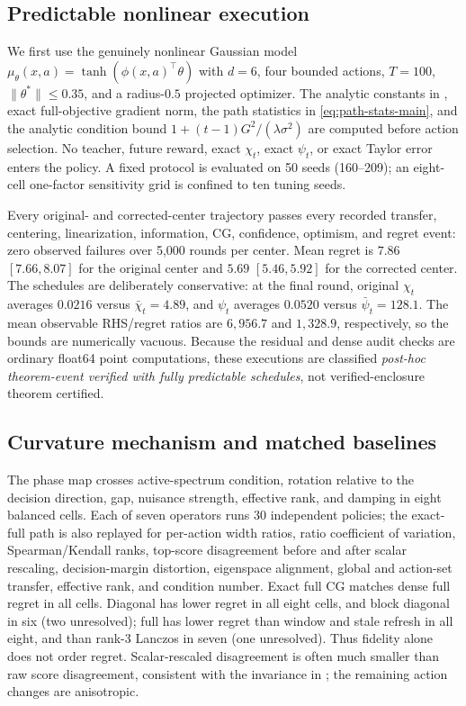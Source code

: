 \documentclass[twoside]{article}
\begin{document}
\subsection{Predictable nonlinear execution}\label{sec:factorial-audit}
We first use the genuinely nonlinear Gaussian model
$\mu_\theta(x,a)=\tanh(\phi(x,a)^\top\theta)$ with $d=6$, four bounded actions,
$T=100$, $\|\theta^*\|\le0.35$, and a radius-$0.5$ projected optimizer.  The
analytic constants in , exact full-objective gradient norm,
the path statistics in \eqref{eq:path-stats-main}, and the analytic condition bound
$1+(t-1)G^2/(\lambda\sigma^2)$ are computed before action selection.  No teacher,
future reward, exact $\chi_t$, exact $\psi_t$, or exact Taylor error enters the
policy.  A fixed protocol is evaluated on 50 seeds (160--209); an eight-cell
one-factor sensitivity grid is confined to ten tuning seeds.

Every original- and corrected-center trajectory passes every recorded transfer,
centering, linearization, information, CG, confidence, optimism, and regret event:
zero observed failures over 5,000 rounds per center.  Mean regret is $7.86$
$[7.66,8.07]$ for the original center and $5.69$ $[5.46,5.92]$ for the corrected
center.  The schedules are deliberately conservative: at the final round, original
$\chi_t$ averages $0.0216$ versus $\bar\chi_t=4.89$, and $\psi_t$ averages
$0.0520$ versus $\bar\psi_t=128.1$.  The mean observable RHS/regret ratios are
$6{,}956.7$ and $1{,}328.9$, respectively, so the bounds are numerically vacuous.
Because the residual and dense audit checks are ordinary float64 point computations,
these executions are classified \emph{post-hoc theorem-event verified with fully
predictable schedules}, not verified-enclosure theorem certified.

\subsection{Curvature mechanism and matched baselines}\label{sec:operator-cg-audit}
The phase map crosses active-spectrum condition, rotation relative to the decision
direction, gap, nuisance strength, effective rank, and damping in eight balanced
cells.  Each of seven operators runs 30 independent policies; the exact-full path
is also replayed for per-action width ratios, ratio coefficient of variation,
Spearman/Kendall ranks, top-score disagreement before and after scalar rescaling,
decision-margin distortion, eigenspace alignment, global and action-set transfer,
effective rank, and condition number.  Exact full CG matches dense full regret in
all cells.  Diagonal has lower regret in all eight cells, and block diagonal in six
(two unresolved); full has lower regret than window and stale refresh in all eight,
and than rank-3 Lanczos in seven (one unresolved).  Thus fidelity alone does not
order regret.  Scalar-rescaled disagreement is often much smaller than raw score
disagreement, consistent with the invariance in ; the
remaining action changes are anisotropic.
\end{document}
